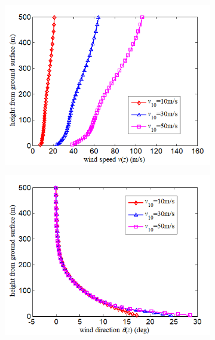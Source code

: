 \documentclass[10pt,a4paper]{article}
\begin{document}
\begin{appendices}
\begin{figure}[!ht]
    \begin{subfigure}{0.3\textwidth}
        \includegraphics[width=\linewidth]{figures/fig_a.png}
        \caption{}
    \end{subfigure}
    \hfill
    \begin{subfigure}{0.3\textwidth}
        \includegraphics[width=\linewidth]{figures/fig_b.png}
        \caption{}
    \end{subfigure}
    \hfill
    \begin{subfigure}{0.3\textwidth}

\end{subfigure}
\end{figure}
\end{appendices}
\end{document}
